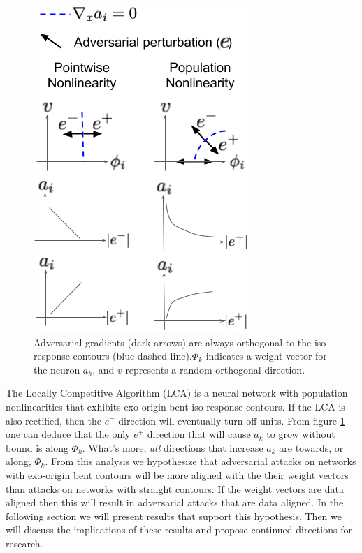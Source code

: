 \begin{figure}\label{fig:ch4_adv_grads}
    \begin{center}
    \centerline{\includegraphics[width=0.5\columnwidth]{figures/adversarial_gradients_iso_contours.png}}
    \end{center}
    \caption{Adversarial gradients (dark arrows) are always orthogonal to the iso-response contours (blue dashed line).$\Phi_{k}$ indicates a weight vector for the neuron $a_{k}$, and $v$ represents a random orthogonal direction.}
\end{figure}

The Locally Competitive Algorithm (LCA) is a neural network with population nonlinearities that exhibits exo-origin bent iso-response contours. If the LCA is also rectified, then the $e^{-}$ direction will eventually turn off units. From figure \ref{fig:ch4_adv_grads} one can deduce that the only $e^{+}$ direction that will cause $a_{k}$ to grow without bound is along $\Phi_{k}$. What's more, \emph{all} directions that increase $a_{k}$ are towards, or along, $\Phi_{k}$. From this analysis we hypothesize that adversarial attacks on networks with exo-origin bent contours will be more aligned with the their weight vectors than attacks on networks with straight contours. If the weight vectors are data aligned then this will result in adversarial attacks that are data aligned. In the following section we will present results that support this hypothesis. Then we will discuss the implications of these results and propose continued directions for research.


